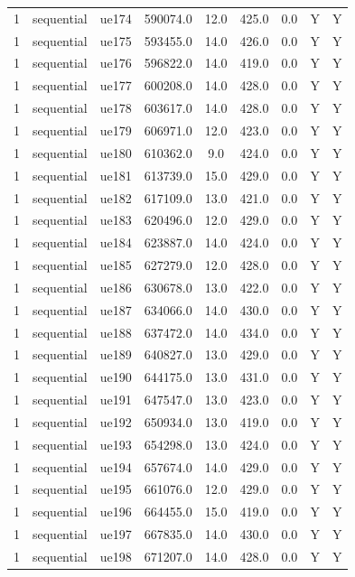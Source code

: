 \begin{table}[ht]
\begin{tabular}{|c|c|c|c|c|c|c|c|c|}
1 & sequential & ue174 & 590074.0 & 12.0 & 425.0 & 0.0 & Y & Y \\
1 & sequential & ue175 & 593455.0 & 14.0 & 426.0 & 0.0 & Y & Y \\
1 & sequential & ue176 & 596822.0 & 14.0 & 419.0 & 0.0 & Y & Y \\
1 & sequential & ue177 & 600208.0 & 14.0 & 428.0 & 0.0 & Y & Y \\
1 & sequential & ue178 & 603617.0 & 14.0 & 428.0 & 0.0 & Y & Y \\
1 & sequential & ue179 & 606971.0 & 12.0 & 423.0 & 0.0 & Y & Y \\
1 & sequential & ue180 & 610362.0 & 9.0 & 424.0 & 0.0 & Y & Y \\
1 & sequential & ue181 & 613739.0 & 15.0 & 429.0 & 0.0 & Y & Y \\
1 & sequential & ue182 & 617109.0 & 13.0 & 421.0 & 0.0 & Y & Y \\
1 & sequential & ue183 & 620496.0 & 12.0 & 429.0 & 0.0 & Y & Y \\
1 & sequential & ue184 & 623887.0 & 14.0 & 424.0 & 0.0 & Y & Y \\
1 & sequential & ue185 & 627279.0 & 12.0 & 428.0 & 0.0 & Y & Y \\
1 & sequential & ue186 & 630678.0 & 13.0 & 422.0 & 0.0 & Y & Y \\
1 & sequential & ue187 & 634066.0 & 14.0 & 430.0 & 0.0 & Y & Y \\
1 & sequential & ue188 & 637472.0 & 14.0 & 434.0 & 0.0 & Y & Y \\
1 & sequential & ue189 & 640827.0 & 13.0 & 429.0 & 0.0 & Y & Y \\
1 & sequential & ue190 & 644175.0 & 13.0 & 431.0 & 0.0 & Y & Y \\
1 & sequential & ue191 & 647547.0 & 13.0 & 423.0 & 0.0 & Y & Y \\
1 & sequential & ue192 & 650934.0 & 13.0 & 419.0 & 0.0 & Y & Y \\
1 & sequential & ue193 & 654298.0 & 13.0 & 424.0 & 0.0 & Y & Y \\
1 & sequential & ue194 & 657674.0 & 14.0 & 429.0 & 0.0 & Y & Y \\
1 & sequential & ue195 & 661076.0 & 12.0 & 429.0 & 0.0 & Y & Y \\
1 & sequential & ue196 & 664455.0 & 15.0 & 419.0 & 0.0 & Y & Y \\
1 & sequential & ue197 & 667835.0 & 14.0 & 430.0 & 0.0 & Y & Y \\
1 & sequential & ue198 & 671207.0 & 14.0 & 428.0 & 0.0 & Y & Y \\

\end{tabular}
\end{table}
